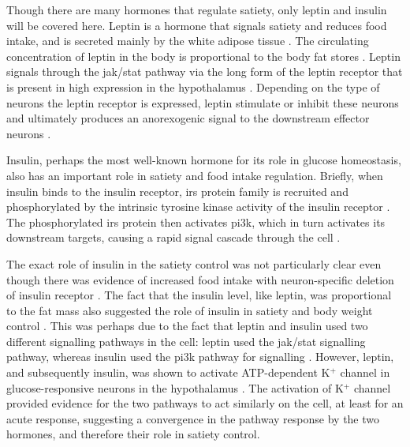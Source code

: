 Though there are many hormones that regulate satiety, only leptin and insulin will be covered here.
Leptin is a hormone that signals satiety and reduces food intake, and is secreted mainly by the white adipose tissue \citep{Moustafa2013,Zhang1994}.
The circulating concentration of leptin in the body is proportional to the body fat stores \citep{Barsh2002, Moustafa2013}.
Leptin signals through the \gls{jak}/\gls{stat} pathway via the long form of the leptin receptor that is present in high expression in the hypothalamus \citep{Ghilardi1996,Lee1996}.
Depending on the type of neurons the leptin receptor is expressed, leptin stimulate or inhibit these neurons and ultimately produces an anorexogenic signal to the downstream effector neurons \citep{Bell2005}.

Insulin, perhaps the most well-known hormone for its role in glucose homeostasis, also has an important role in satiety and food intake regulation.
Briefly, when insulin binds to the insulin receptor, \gls{irs} protein family is recruited and phosphorylated by the  intrinsic tyrosine kinase activity of the insulin receptor \citep{Saltiel2002}.
The phosphorylated \gls{irs} protein then activates \gls{pi3k}, which in turn activates its downstream targets, causing a rapid signal cascade through the cell \citep{Saltiel2002}.

The exact role of insulin in the satiety control was not particularly clear even though there was evidence of increased food intake with neuron-specific deletion of insulin receptor \citep{Barsh2002,Bruning2000}.
The fact that the insulin level, like leptin, was proportional to the fat mass also suggested the role of insulin in satiety and body weight control \citep{Barsh2002, Bruning2000, Woods1979}.
This was perhaps due to the fact that leptin and insulin used two different signalling pathways in the cell: leptin used the \gls{jak}/\gls{stat} signalling pathway, whereas insulin used the \gls{pi3k} pathway for signalling \citep{Ghilardi1996}.
However, leptin, and subsequently insulin, was shown to activate ATP-dep\-endent K$^+$ channel in glucose-responsive neurons in the hypothalamus \citep{Spanswick1997, Spanswick2000}.
The activation of K$^+$ channel provided evidence for the two pathways to act similarly on the cell, at least for an acute response, suggesting a convergence in the pathway response by the two hormones, and therefore their role in satiety control.

